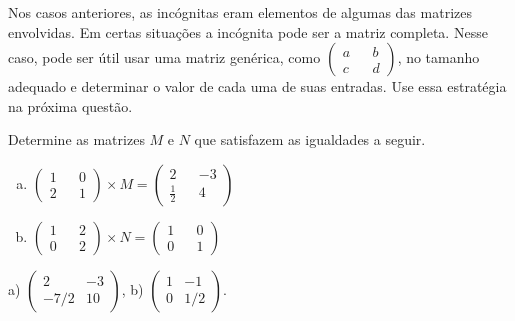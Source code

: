 \documentclass[main_estudante.tex]{subfiles}
\begin{document}
Nos casos anteriores, as incógnitas eram elementos de algumas das matrizes envolvidas. Em certas situações a incógnita pode ser a matriz completa. Nesse caso, pode ser útil usar uma matriz genérica, como $\begin{pmatrix} a && b \\ c && d \end{pmatrix}$, no tamanho adequado e determinar o valor de cada uma de suas entradas. Use essa estratégia na próxima questão.

\begin{questao}
Determine as matrizes $M$ e $N$ que satisfazem as igualdades a seguir.
\begin{enumerate}[a)]
\item $ \begin{pmatrix} 1 && 0 \\ 2 && 1 \end{pmatrix} \times M = \begin{pmatrix} 2 && -3 \\ \frac{1}{2} && 4 \end{pmatrix} $
\item $ \begin{pmatrix} 1 && 2 \\ 0 && 2 \end{pmatrix} \times N = \begin{pmatrix} 1 && 0 \\ 0 && 1 \end{pmatrix} $ 
\end{enumerate}
\end{questao}

\begin{gabarito}
	\begin{gabaritoQuestao}
		a) $\begin{pmatrix} 2 & -3 \\ -7/2 & 10\end{pmatrix}$, b) $\begin{pmatrix} 1 & -1 \\ 0 & 1/2\end{pmatrix}$.
	\end{gabaritoQuestao}
\end{gabarito}
\end{document}
